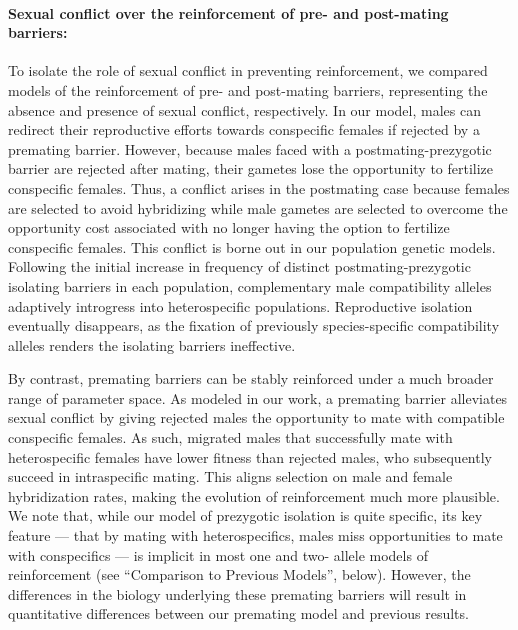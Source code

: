 \documentclass[11pt]{article}
\begin{document}
\paragraph{Sexual conflict over the reinforcement of  pre- and post-mating barriers:}    
To isolate the role of sexual conflict in preventing reinforcement, we compared models of the reinforcement of pre- and post-mating barriers, representing  the absence and presence of sexual conflict, respectively.  
In our model, males can redirect their reproductive efforts towards conspecific females if rejected by a premating barrier. 
However, because males faced with a postmating-prezygotic barrier are rejected after mating, their gametes lose the opportunity to fertilize conspecific females. 
Thus, a conflict arises in the postmating case because females are selected to avoid hybridizing while male gametes are selected to overcome the opportunity cost associated with no longer having the option to fertilize conspecific females.  
This conflict is borne out in our population genetic models. 
Following the initial increase in frequency of distinct postmating-prezygotic isolating barriers in each population, complementary male compatibility alleles adaptively introgress  into heterospecific populations.  
Reproductive isolation eventually disappears, as the fixation of previously species-specific compatibility alleles renders the isolating barriers ineffective.

By contrast, premating barriers can be stably reinforced under a much broader range of parameter space. 
As modeled in our work, a premating barrier alleviates sexual conflict by giving rejected males the opportunity to mate with compatible conspecific females.  
As such, migrated males that successfully mate with heterospecific females have lower fitness than rejected males, who subsequently succeed in intraspecific mating. 
This aligns selection on male and female hybridization rates, making the evolution of reinforcement much more plausible. %
We note that, while our model of prezygotic isolation is quite specific, its key feature --- that by mating with heterospecifics, males miss opportunities to mate with conspecifics --- is implicit in most one and two- allele models of reinforcement (see ``Comparison to Previous Models'', below). 
However, the differences in the biology underlying these premating barriers will result in quantitative differences between our premating model and previous results. 
\end{document}
